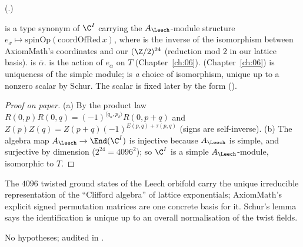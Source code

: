 (.)
\begin{dictionary}
 is a type synonym of $\C^I$ carrying the $A_\Leech$-module structure
$e_x\mapsto\mathrm{spinOp}(\mathrm{coordOfRed}\,x)$, where  is the inverse of the
isomorphism  between AxiomMath's coordinates and our $(\Z/2)^{24}$ (reduction mod $2$ in
our lattice basis).   is $\bar\alpha$.   is the action of $e_\alpha$ on $T$
(Chapter~\ref{ch:06}).   (Chapter~\ref{ch:06}) is uniqueness of the simple
module;  is \emph{a} choice of isomorphism, unique up to a nonzero scalar by Schur.  The
scalar is fixed later by the form ().
\end{dictionary}
\begin{proof}[Proof on paper]
(a) By the product law $R(0,p)R(0,q)=(-1)^{\langle q_a,p_\delta\rangle}R(0,p+q)$ and
$Z(p)Z(q)=Z(p+q)(-1)^{E(p,q)+\tau(p,q)}$ (signs are self-inverse).  (b) The algebra map
$A_\Leech\to\End(\C^I)$ is injective because $A_\Leech$ is simple, and surjective by dimension
($2^{24}=4096^2$); so $\C^I$ is a simple $A_\Leech$-module, isomorphic to $T$.
\end{proof}
\begin{physics}
The $4096$ twisted ground states of the Leech orbifold carry the unique irreducible representation of
the ``Clifford algebra'' of lattice exponentials; AxiomMath's explicit signed permutation matrices are
one concrete basis for it.  Schur's lemma says the identification is unique up to an overall
normalisation of the twist fields.
\end{physics}
\begin{status}
No hypotheses; audited in .
\end{status}

